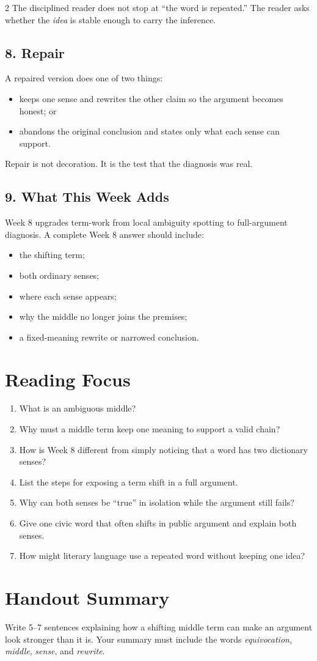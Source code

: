 \documentclass[12pt]{article}
\begin{document}
\begin{multicols}{2}
The disciplined reader does not stop at ``the word is repeated.'' The reader asks whether the \textit{idea} is stable enough to carry the inference.

\subsection*{8. Repair}
A repaired version does one of two things:
\begin{itemize}[leftmargin=*]
\item keeps one sense and rewrites the other claim so the argument becomes honest; or
\item abandons the original conclusion and states only what each sense can support.
\end{itemize}
Repair is not decoration. It is the test that the diagnosis was real.

\subsection*{9. What This Week Adds}
Week 8 upgrades term-work from local ambiguity spotting to full-argument diagnosis. A complete Week 8 answer should include:
\begin{itemize}[leftmargin=*,itemsep=0.12em]
\item the shifting term;
\item both ordinary senses;
\item where each sense appears;
\item why the middle no longer joins the premises;
\item a fixed-meaning rewrite or narrowed conclusion.
\end{itemize}

\section*{Reading Focus}
\begin{enumerate}[leftmargin=*]
\item What is an ambiguous middle?
\item Why must a middle term keep one meaning to support a valid chain?
\item How is Week 8 different from simply noticing that a word has two dictionary senses?
\item List the steps for exposing a term shift in a full argument.
\item Why can both senses be ``true'' in isolation while the argument still fails?
\item Give one civic word that often shifts in public argument and explain both senses.
\item How might literary language use a repeated word without keeping one idea?
\end{enumerate}

\section*{Handout Summary}
Write 5--7 sentences explaining how a shifting middle term can make an argument look stronger than it is. Your summary must include the words \textit{equivocation}, \textit{middle}, \textit{sense}, and \textit{rewrite}.
\end{multicols}
\end{document}
